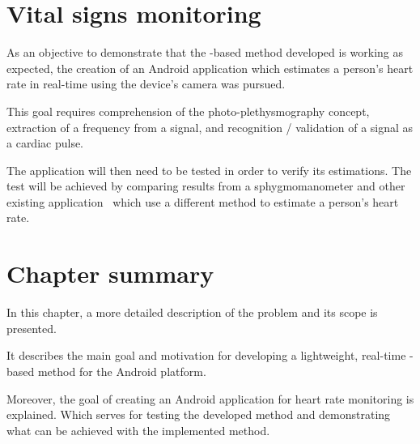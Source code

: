 \section{Vital signs monitoring} \label{sec:problem:heart}

As an objective to demonstrate that the \evm{}-based method developed is
working as expected, the creation of an Android application which
estimates a person's heart rate in real-time using the device's camera was
pursued.

This goal requires comprehension of the photo-plethysmography concept,
extraction of a frequency from a signal, and recognition / validation of a
signal as a cardiac pulse.

The application will then need to be tested in order to verify its estimations.
The test will be achieved by comparing results from a sphygmomanometer and
other existing application~\cite{Vitrox2013} which use a different
method to estimate a person's heart rate.

\section{Chapter summary}

In this chapter, a more detailed description of the problem and its scope is
presented.

It describes the main goal and motivation for developing a lightweight,
real-time \evm{}-based method for the Android platform.

Moreover, the goal of creating an Android application for heart rate monitoring
is explained. Which serves for testing the developed method and demonstrating
what can be achieved with the implemented \evm{} method.
